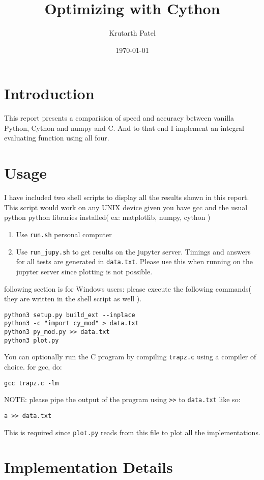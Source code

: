 \documentclass{article}
\title{Optimizing with Cython}
\author{Krutarth Patel}
\date{\today}
\begin{document}
\maketitle

\section{Introduction}
This report presents a comparision of speed and accuracy between vanilla Python, Cython and numpy and C. And to that end I implement an integral evaluating function using all four.
\section{Usage}
I have included two shell scripts to display all the results shown in this report. This script would work on any UNIX device given you have gcc and the usual python python libraries installed( ex: matplotlib, numpy, cython ) 
\begin{enumerate}
	\item Use \texttt{run.sh} personal computer
	\item Use \texttt{run\_jupy.sh} to get results on the jupyter server. Timings and answers for all tests are generated in \texttt{data.txt}. Please use this when running on the jupyter server since plotting is not possible.
\end{enumerate}
following section is for Windows users:
please execute the following commands( they are written in the shell script as well ).

\begin{verbatim}
python3 setup.py build_ext --inplace
python3 -c "import cy_mod" > data.txt
python3 py_mod.py >> data.txt
python3 plot.py
\end{verbatim}

You can optionally run the C program by compiling \texttt{trapz.c} using a compiler of choice. 
for gcc, do:
\begin{verbatim}
gcc trapz.c -lm
\end{verbatim}
NOTE: please pipe the output of the program using \texttt{>>} to \texttt{data.txt} like so: 

\begin{verbatim}
a >> data.txt
\end{verbatim}

This is required since \texttt{plot.py} reads from this file to plot all the implementations. 

\section{Implementation Details}
\end{document}
